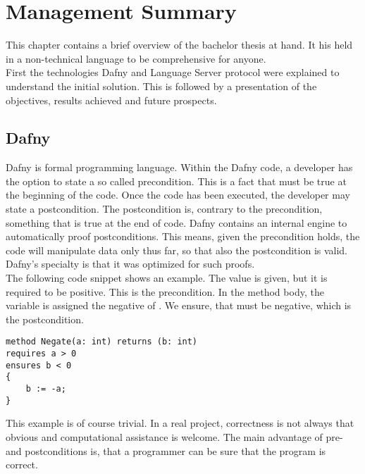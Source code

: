 \section{Management Summary}
\label{section:management_summary}


This chapter contains a brief overview of the bachelor thesis at hand.
It his held in a non-technical language to be comprehensive for anyone. \\

First the technologies Dafny and Language Server protocol were explained to understand the initial solution.
This is followed by a presentation of the objectives, results achieved and future prospects.

\subsection{Dafny}
\label{section:introduction:dafny}
Dafny is formal programming language.
Within the Dafny code, a developer has the option to state a so called precondition.
This is a fact that must be true at the beginning of the code.
Once the code has been executed, the developer may state a postcondition.
The postcondition is, contrary to the precondition, something that is true at the end of code.
Dafny contains an internal engine to automatically proof postconditions.
This means, given the precondition holds, the code will manipulate data only thus far, so that also the postcondition is valid.
Dafny's specialty is that it was optimized for such proofs. \\

The following code snippet shows an example.
The value  is given, but it is required to be positive.
This is the precondition.
In the method body, the variable  is assigned the negative of .
We ensure, that  must be negative, which is the postcondition.

\begin{lstlisting}[language=dafny, caption={Simple Dafny Example}, captionpos=b, label={lst:simpleDafnyExample}]
method Negate(a: int) returns (b: int)
requires a > 0
ensures b < 0
{
    b := -a;
}
\end{lstlisting}

This example is of course trivial.
In a real project, correctness is not always that obvious and computational assistance is welcome.
The main advantage of pre- and postconditions is, that a programmer can be sure that the program is correct.

